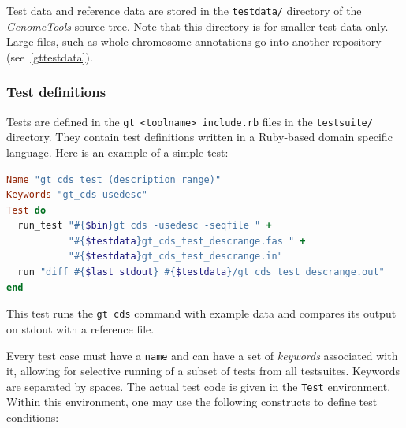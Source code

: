 \documentclass[11pt,final]{article}
\newcommand{\keyword}[1]{\lstinline{#1}}
\newcommand{\Gt}[0]{\emph{GenomeTools}\xspace}
\begin{document}
Test data and reference data are stored in the \keyword{testdata/} directory
of the \Gt source tree. Note that this directory is for smaller test data only.
Large files, such as whole chromosome annotations go into another repository
(see~\ref{gttestdata}).

\subsubsection{Test definitions}

Tests are defined in the \keyword{gt_<toolname>_include.rb} files in the
\keyword{testsuite/} directory. They contain test definitions written in a
Ruby-based domain specific language. Here is an example of a simple test:

\begin{lstlisting}[language=Ruby]
Name "gt cds test (description range)"
Keywords "gt_cds usedesc"
Test do
  run_test "#{$bin}gt cds -usedesc -seqfile " +
           "#{$testdata}gt_cds_test_descrange.fas " +
           "#{$testdata}gt_cds_test_descrange.in"
  run "diff #{$last_stdout} #{$testdata}/gt_cds_test_descrange.out"
end
\end{lstlisting}%

This test runs the \keyword{gt cds} command with example data and compares its
output on stdout with a reference file.

Every test case must have a \keyword{name} and can have a set of \emph{keywords}
associated with it, allowing for selective running of a subset of tests from
all testsuites. Keywords are separated by spaces.
The actual test code is given in the \keyword{Test} environment.
Within this environment, one may use the following constructs to define test
conditions:
\end{document}
